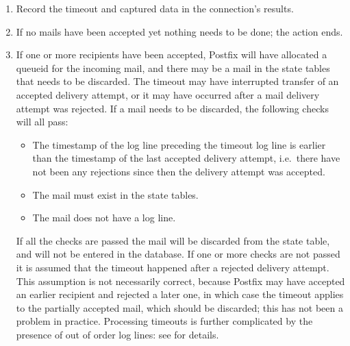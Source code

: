 \begin{enumerate}

    \item Record the timeout and captured data in the connection's results.

    \item If no mails have been accepted yet nothing needs to be done; the
         action ends.

    \item If one or more recipients have been accepted, Postfix will have
        allocated a queueid for the incoming mail, and there may be a mail
        in the state tables that needs to be discarded.  The timeout may
        have interrupted transfer of an accepted delivery attempt, or it
        may have occurred after a mail delivery attempt was rejected.  If a
        mail needs to be discarded, the following checks will all pass:

        \begin{itemize}

            \item The timestamp of the log line preceding the timeout log
                line is earlier than the timestamp of the last accepted
                delivery attempt, i.e.\ there have not been any rejections
                since then the delivery attempt was accepted.

            \item The mail must exist in the state tables.

            \item The mail does not have a  log line.

        \end{itemize}

        If all the checks are passed the mail will be discarded from the
        state table, and will not be entered in the database.  If one or
        more checks are not passed it is assumed that the timeout happened
        after a rejected delivery attempt.  This assumption is not
        necessarily correct, because Postfix may have accepted an earlier
        recipient and rejected a later one, in which case the timeout
        applies to the partially accepted mail, which should be discarded;
        this has not been a problem in practice.  Processing timeouts is
        further complicated by the presence of out of order
         log lines: see  for details.

\end{enumerate}

